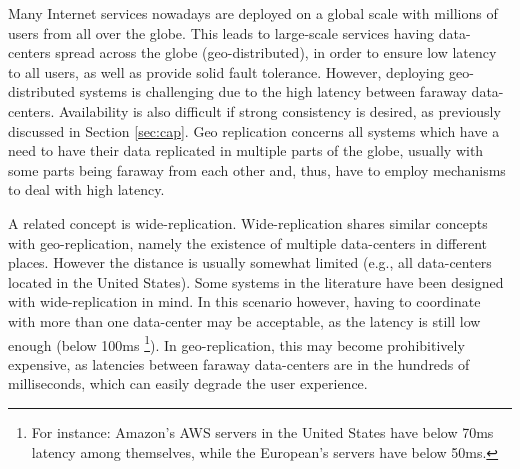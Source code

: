 
Many Internet services nowadays are deployed on a global scale with millions of users from all over the globe.
This leads to large-scale services having data-centers spread across the globe (geo-distributed), in order to ensure low latency to all users, as well as provide solid fault tolerance.
However, deploying geo-distributed systems is challenging due to the high latency between faraway data-centers. Availability is also difficult if strong consistency is desired, as previously discussed in Section \ref{sec:cap}.
Geo replication concerns all systems which have a need to have their data replicated in multiple parts of the globe, usually with some parts being faraway from each other and, thus, have to employ mechanisms to deal with high latency.

A related concept is wide-replication.
Wide-replication shares similar concepts with geo-replication, namely the existence of multiple data-centers in different places. 
However the distance is usually somewhat limited (e.g., all data-centers located in the United States).
Some systems in the literature have been designed with wide-replication in mind.
In this scenario however, having to coordinate with more than one data-center may be acceptable, as the latency is still low enough (below 100ms  \footnote{For instance: Amazon's AWS servers in the United States have below 70ms latency among themselves, while the European's servers have below 50ms.}).
In geo-replication, this may become prohibitively expensive, as latencies between faraway data-centers are in the hundreds of milliseconds, which can easily degrade the user experience.


